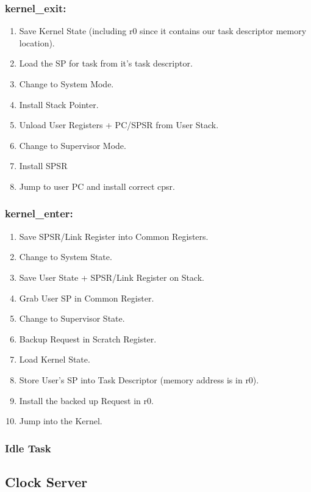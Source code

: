 \documentclass{article}
\begin{document}
\subsubsection{kernel\_exit:}
\begin{enumerate}
    \item Save Kernel State (including r0 since it contains our task descriptor memory location).
    \item Load the SP for task from it's task descriptor.
    \item Change to System Mode. 
    \item Install Stack Pointer.
    \item Unload User Registers + PC/SPSR from User Stack.
    \item Change to Supervisor Mode.
    \item Install SPSR
    \item Jump to user PC and install correct cpsr.
\end{enumerate}

\subsubsection{kernel\_enter:}
\begin{enumerate}
   \item Save SPSR/Link Register into Common Registers.
   \item Change to System State.
   \item Save User State + SPSR/Link Register on Stack.
   \item Grab User SP in Common Register.
   \item Change to Supervisor State.
   \item Backup Request in Scratch Register.
   \item Load Kernel State.
   \item Store User's SP into Task Descriptor (memory address is in r0).
   \item Install the backed up Request in r0.
   \item Jump into the Kernel.
\end{enumerate}

\subsubsection{Idle Task}

\subsection{Clock Server}
\end{document}
